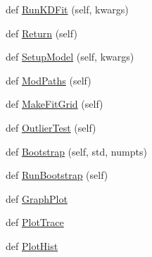 \begin{DoxyCompactItemize}
\item 
def \hyperlink{class_uni_dec_1_1unidec__modules_1_1_uni_fit_1_1_k_dmodel_a7780889f46a9b9565235e8f670d1a0c4}{Run\+K\+D\+Fit} (self, kwargs)
\item 
def \hyperlink{class_uni_dec_1_1unidec__modules_1_1_uni_fit_1_1_k_dmodel_a61daa959cb6dfacda8a4876403895a0a}{Return} (self)
\item 
def \hyperlink{class_uni_dec_1_1unidec__modules_1_1_uni_fit_1_1_k_dmodel_af9db0fb748a66e4d46ea16278f6fdc0e}{Setup\+Model} (self, kwargs)
\item 
def \hyperlink{class_uni_dec_1_1unidec__modules_1_1_uni_fit_1_1_k_dmodel_a3523dc65d966bef678fda9aad9a54ea7}{Mod\+Paths} (self)
\item 
def \hyperlink{class_uni_dec_1_1unidec__modules_1_1_uni_fit_1_1_k_dmodel_a716ee30b7e996d6f008d819f0fcd8a1d}{Make\+Fit\+Grid} (self)
\item 
def \hyperlink{class_uni_dec_1_1unidec__modules_1_1_uni_fit_1_1_k_dmodel_a95b405be8cbe687bd1be30daae5016be}{Outlier\+Test} (self)
\item 
def \hyperlink{class_uni_dec_1_1unidec__modules_1_1_uni_fit_1_1_k_dmodel_ac5e05a1c678541c2db951d6dda8450bc}{Bootstrap} (self, std, numpts)
\item 
def \hyperlink{class_uni_dec_1_1unidec__modules_1_1_uni_fit_1_1_k_dmodel_a5e873ac21652cc988efab007860a8036}{Run\+Bootstrap} (self)
\item 
def \hyperlink{class_uni_dec_1_1unidec__modules_1_1_uni_fit_1_1_k_dmodel_a3f26c29d1ae96e0b32774c985d266fba}{Graph\+Plot}
\item 
def \hyperlink{class_uni_dec_1_1unidec__modules_1_1_uni_fit_1_1_k_dmodel_a3f16d062e4474ffbef6f9907acabcc78}{Plot\+Trace}
\item 
def \hyperlink{class_uni_dec_1_1unidec__modules_1_1_uni_fit_1_1_k_dmodel_ad08a1ef171e0a2d56c484d654b76f6cc}{Plot\+Hist}
\end{DoxyCompactItemize}
